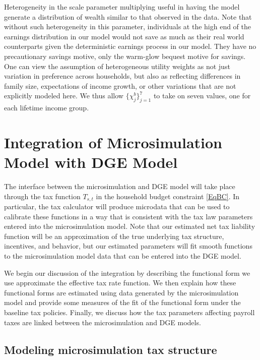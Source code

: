 \documentclass[letterpaper,12pt]{article}
\theoremstyle{definition}
\begin{document}
\begin{spacing}{1.5}
    Heterogeneity in the scale parameter multiplying useful in having the model generate a distribution of wealth similar to that observed in the data.  Note that without such heterogeneity in this parameter, individuals at the high end of the earnings distribution in our model would not save as much as their real world counterparts given the deterministic earnings process in our model. They have no precautionary savings motive, only the warm-glow bequest motive for savings.  One can view the assumption of heterogeneous utility weights as not just variation in preference across households, but also as reflecting differences in family size, expectations of income growth, or other variations that are not explicitly modeled here.  We thus allow  $\{\chi^b_j\}_{j=1}^7$ to take on seven values, one for each lifetime income group.


\section{Integration of Microsimulation Model with DGE Model}\label{SecIntegr}

  The interface between the microsimulation and DGE model will take place through the tax function $T_{s,t}$ in the household budget constraint \eqref{EqBC}. In particular, the tax calculator will produce microdata that can be used to calibrate these functions in a way that is consistent with the tax law parameters entered into the microsimulation model. Note that our estimated net tax liability function will be an approximation of the true underlying tax structure, incentives, and behavior, but our estimated parameters will fit smooth functions to the microsimulation model data that can be entered into the DGE model.

  We begin our discussion of the integration by describing the functional form we use approximate the effective tax rate function. We then explain how these functional forms are estimated using data generated by the microsimulation model and provide some measures of the fit of the functional form under the baseline tax policies. Finally, we discuss how the tax parameters affecting payroll taxes are linked between the microsimulation and DGE models.


  \subsection{Modeling microsimulation tax structure}\label{SecIntegrMicrosim}


\end{spacing}
\end{document}
